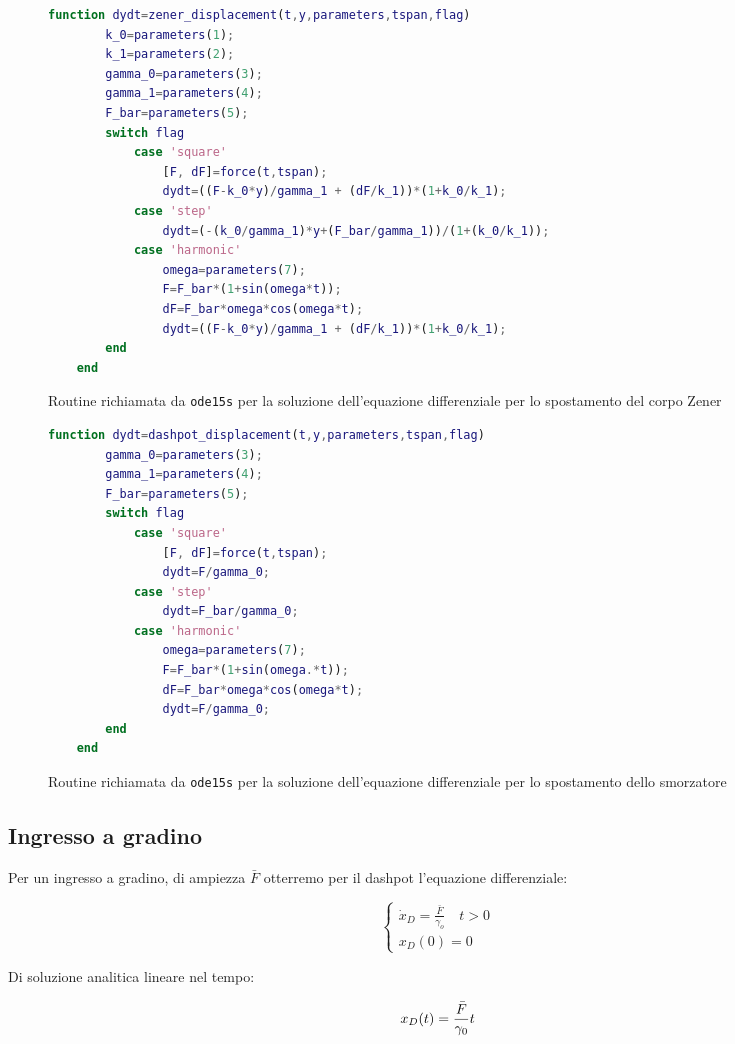 \begin{figure}[t!]
\begin{lstlisting}[language=matlab]
	function dydt=zener_displacement(t,y,parameters,tspan,flag)
		k_0=parameters(1);
		k_1=parameters(2);
		gamma_0=parameters(3);
		gamma_1=parameters(4);
		F_bar=parameters(5);
		switch flag
			case 'square'
				[F, dF]=force(t,tspan);
				dydt=((F-k_0*y)/gamma_1 + (dF/k_1))*(1+k_0/k_1);
			case 'step'
				dydt=(-(k_0/gamma_1)*y+(F_bar/gamma_1))/(1+(k_0/k_1));
			case 'harmonic'
				omega=parameters(7);
				F=F_bar*(1+sin(omega*t));
				dF=F_bar*omega*cos(omega*t);
				dydt=((F-k_0*y)/gamma_1 + (dF/k_1))*(1+k_0/k_1);
		end
	end
\end{lstlisting}
\caption{Routine richiamata da \texttt{ode15s} per la soluzione dell'equazione differenziale per lo spostamento del corpo Zener}
\vspace{0.8cm}
\begin{lstlisting}[language=matlab]
	function dydt=dashpot_displacement(t,y,parameters,tspan,flag)
		gamma_0=parameters(3);
		gamma_1=parameters(4);
		F_bar=parameters(5);
		switch flag
			case 'square'
				[F, dF]=force(t,tspan);
				dydt=F/gamma_0;
			case 'step'
				dydt=F_bar/gamma_0;
			case 'harmonic'
				omega=parameters(7);
				F=F_bar*(1+sin(omega.*t));
				dF=F_bar*omega*cos(omega*t);
				dydt=F/gamma_0;
		end
	end	
\end{lstlisting}
\caption{Routine richiamata da \texttt{ode15s} per la soluzione dell'equazione differenziale per lo spostamento dello smorzatore}
\label{fig:routineode}
\end{figure}



\subsection{Ingresso a gradino}

Per un ingresso a gradino, di ampiezza $\bar F$ otterremo per il dashpot l'equazione differenziale:

\begin{equation}
	\left\{\begin{array}{l}
		\dot{x}_D=\frac{\bar{F}}{\gamma_{o}} \quad t>0 \\
		x_{D}(0)=0
	\end{array}\right.
\end{equation}

Di soluzione analitica lineare nel tempo:

\begin{equation}
	x_D(t)={\bar F\over \gamma_0}t
\end{equation}

